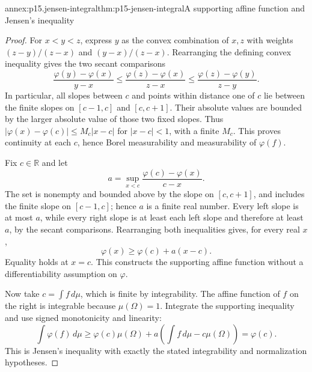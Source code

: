 \begin{annexitem}{annex:p15.jensen-integral}{thm:p15-jensen-integral}{A supporting affine function and Jensen's inequality}
\begin{proof}
For \(x<y<z\), express \(y\) as the convex combination of \(x,z\)
with weights \((z-y)/(z-x)\) and \((y-x)/(z-x)\). Rearranging
the defining convex inequality gives the two secant comparisons
\[
 \frac{\varphi(y)-\varphi(x)}{y-x}
 \leq\frac{\varphi(z)-\varphi(x)}{z-x}
 \leq\frac{\varphi(z)-\varphi(y)}{z-y}.
\]
In particular, all slopes between \(c\) and points within distance
one of \(c\) lie between the finite slopes on \([c-1,c]\)
and \([c,c+1]\). Their absolute values are bounded by the larger
absolute value of those two fixed slopes. Thus
\(|\varphi(x)-\varphi(c)|\leq M_c|x-c|\) for \(|x-c|<1\),
with a finite \(M_c\). This proves continuity at each \(c\),
hence Borel measurability and measurability of \(\varphi(f)\).

Fix \(c\in\mathbb R\) and let
\[
 a=\sup_{x<c}\frac{\varphi(c)-\varphi(x)}{c-x}.
\]
The set is nonempty and bounded above by the slope on \([c,c+1]\),
and includes the finite slope on \([c-1,c]\); hence \(a\) is
a finite real number. Every left slope is at most \(a\), while
every right slope is at least each left slope and therefore at least
\(a\), by the secant comparisons. Rearranging both inequalities
gives, for every real \(x\),
\[
 \varphi(x)\geq\varphi(c)+a(x-c).
\]
Equality holds at \(x=c\). This constructs the supporting affine
function without a differentiability assumption on \(\varphi\).

Now take \(c=\int f\,d\mu\), which is finite by integrability.
The affine function of \(f\) on the right is integrable because
\(\mu(\Omega)=1\). Integrate the supporting inequality and use
signed monotonicity and linearity:
\[
 \int\varphi(f)\,d\mu
  \geq\varphi(c)\mu(\Omega)+a\left(\int f\,d\mu-c\mu(\Omega)\right)
  =\varphi(c).
\]
This is Jensen's inequality with exactly the stated integrability
and normalization hypotheses.
\end{proof}
\end{annexitem}

